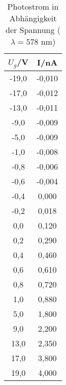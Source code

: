 \begin{table}[h]
	\begin{center}
		\begin{tabular}{cc}
			$U_g$/V&I/nA \\ \hline
			-19,0&-0,010\\
			-17,0&-0,012\\
			-13,0&-0,011\\
			 -9,0&-0,009\\
			 -5,0&-0,009\\
			 -1,0&-0,008\\
			 -0,8&-0,006\\
			 -0,6&-0,004\\
			 -0,4&0,000\\
			 -0,2&0,018\\
			  0,0&0,120\\
			  0,2&0,290\\
			  0,4&0,460\\
			  0,6&0,610\\
			  0,8&0,720\\
			  1,0&0,880\\
			  5,0&1,800\\
			  9,0&2,200\\
			 13,0&2,350\\
			 17,0&3,800\\
			 19,0&4,000
		\end{tabular}
		\caption{Photostrom in Abhängigkeit der Spannung ($\lambda=578$ nm)}
		\label{tabay}
	\end{center}
\end{table}
